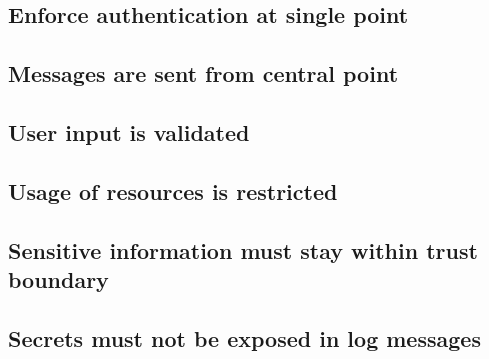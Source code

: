 \subsection{Enforce authentication at single point} 

\subsection{Messages are sent from central point} 

\subsection{User input is validated}  

\subsection{Usage of resources is restricted} 

\subsection{Sensitive information must stay within trust boundary}

\subsection{Secrets must not be exposed in log messages}

